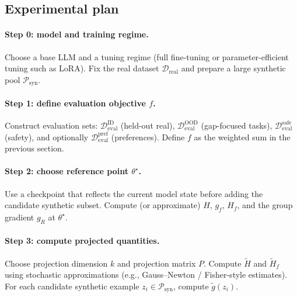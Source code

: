 \documentclass{article}
\theoremstyle{plain}
\theoremstyle{definition}
\theoremstyle{remark}
\begin{document}
\subsection{Experimental plan}
\paragraph{Step 0: model and training regime.}
Choose a base LLM and a tuning regime (full fine-tuning or parameter-efficient tuning such as LoRA).
Fix the real dataset $\mathcal{D}_{\mathrm{real}}$ and prepare a large synthetic pool $\mathcal{P}_{\mathrm{syn}}$.

\paragraph{Step 1: define evaluation objective $f$.}
Construct evaluation sets:
$\mathcal{D}_{\mathrm{eval}}^{\mathrm{ID}}$ (held-out real),
$\mathcal{D}_{\mathrm{eval}}^{\mathrm{OOD}}$ (gap-focused tasks),
$\mathcal{D}_{\mathrm{eval}}^{\mathrm{safe}}$ (safety),
and optionally $\mathcal{D}_{\mathrm{eval}}^{\mathrm{pref}}$ (preferences).
Define $f$ as the weighted sum in the previous section.

\paragraph{Step 2: choose reference point $\theta^\star$.}
Use a checkpoint that reflects the current model state before adding the candidate synthetic subset.
Compute (or approximate) $H$, $g_f$, $H_f$, and the group gradient $g_R$ at $\theta^\star$.

\paragraph{Step 3: compute projected quantities.}
Choose projection dimension $k$ and projection matrix $P$.
Compute $\tilde{H}$ and $\tilde{H}_f$ using stochastic approximations (e.g., Gauss--Newton / Fisher-style estimates).
For each candidate synthetic example $z_i\in\mathcal{P}_{\mathrm{syn}}$, compute $\tilde{g}(z_i)$.
\end{document}
